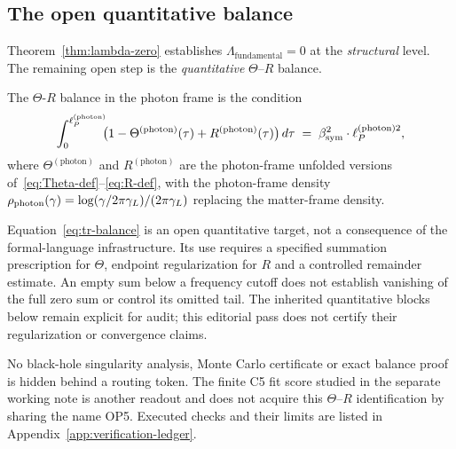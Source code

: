 \subsection{The open quantitative balance}
\label{ssec:open-balance}

Theorem~\ref{thm:lambda-zero} establishes $\Lambda_{\mathrm{fundamental}}=0$
at the \emph{structural} level. The remaining open step is the
\emph{quantitative} $\Theta$--$R$ balance.

\begin{definition}
\label{def:tr-balance}
The $\Theta$-$R$ balance in the photon frame is the condition
\begin{equation}\label{eq:tr-balance}
  \int_0^{\ell_P^{(\mathrm{photon})}} \!\!
  \bigl(1 - \Theta^{(\mathrm{photon})}(\tau) + R^{(\mathrm{photon})}(\tau)\bigr)
  \,d\tau \;=\; \beta_{\mathrm{sym}}^2 \cdot \ell_P^{(\mathrm{photon})2},
\end{equation}
where $\Theta^{(\mathrm{photon})}$ and $R^{(\mathrm{photon})}$ are the
photon-frame unfolded versions of~\eqref{eq:Theta-def}--\eqref{eq:R-def},
with the photon-frame density $\rho_{\mathrm{photon}}(\gamma) =
\log(\gamma/2\pi\gamma_L)/(2\pi\gamma_L)$ replacing the matter-frame density.
\end{definition}

\begin{remark}
\label{rem:op5-reading-contract}
Equation~\eqref{eq:tr-balance} is an open quantitative target, not
a consequence of the formal-language infrastructure. Its use requires
a specified summation prescription for $\Theta$, endpoint
regularization for $R$ and a controlled remainder estimate. An empty
sum below a frequency cutoff does not establish vanishing of the full
zero sum or control its omitted tail. The inherited quantitative
blocks below remain explicit for audit; this editorial pass does not
certify their regularization or convergence claims.

No black-hole singularity analysis, Monte Carlo certificate or exact
balance proof is hidden behind a routing token. The finite C5 fit
score studied in the separate working note is another readout and
does not acquire this $\Theta$--$R$ identification by sharing the
name OP5. Executed checks and their limits are listed in
Appendix~\ref{app:verification-ledger}.
\end{remark}

